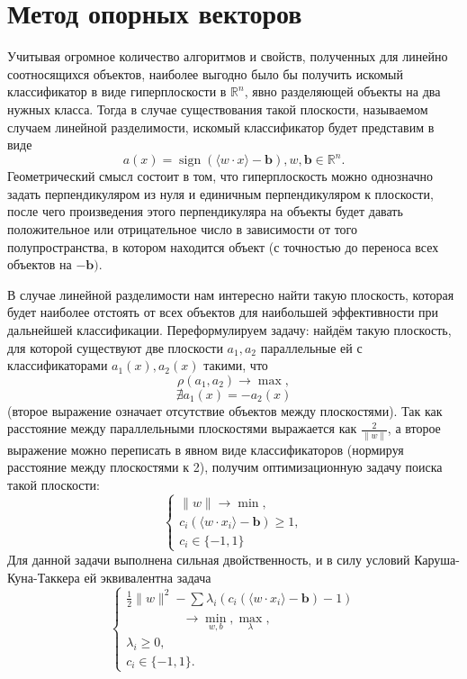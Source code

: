 \documentclass[twoside,twocolumn]{article}
\theoremstyle{plain}
\theoremstyle{definition}
\DeclareMathOperator{\sign}{sign}
\begin{document}
\section{Метод опорных векторов}
Учитывая огромное количество алгоритмов и свойств, полученных для линейно соотносящихся объектов, наиболее выгодно было бы получить искомый классификатор в виде гиперплоскости в $\mathbb{R}^n$, явно разделяющей объекты на два нужных класса. Тогда в случае существования такой плоскости, называемом случаем линейной разделимости, искомый классификатор будет представим в виде
\[ a(x) = \sign(\langle w \cdot x \rangle - \mathbf{b}), w, \mathbf{b} \in \mathbb{R}^n. \]
Геометрический смысл состоит в том, что гиперплоскость можно однозначно задать перпендикуляром из нуля и единичным перпендикуляром к плоскости, после чего произведения этого перпендикуляра на объекты будет давать положительное или отрицательное число в зависимости от того полупространства, в котором находится объект (с точностью до переноса всех объектов на $-\mathbf{b}).$ \par
В случае линейной разделимости нам интересно найти такую плоскость, которая будет наиболее отстоять от всех объектов для наибольшей эффективности при дальнейшей классификации. Переформулируем задачу: найдём такую плоскость, для которой существуют две плоскости $a_1, a_2$ параллельные ей с классификаторами $a_1(x), a_2(x)$ такими, что 
\[\rho(a_1, a_2) \xrightarrow{} \max,\] \[\nexists a_1(x) = -a_2(x)\] 
(второе выражение означает отсутствие объектов между плоскостями).
Так как расстояние между параллельными плоскостями выражается как $\frac{2}{\|w\|}$, а второе выражение можно переписать в явном виде классификаторов (нормируя расстояние между плоскостями к 2), получим оптимизационную задачу поиска такой плоскости:
\[
\begin{cases}
\|w\| \xrightarrow{} \min,\\
c_i(\langle w \cdot x_i \rangle - \mathbf{b}) \geq 1, \\
c_i \in \{-1, 1\}
\end{cases}
\]
Для данной задачи выполнена сильная двойственность, и в силу условий Каруша-Куна-Таккера ей эквивалентна задача 
\[
\begin{cases}
\frac{1}{2}\|w\|^2 - \sum \lambda_i (c_i(\langle w\cdot x_i \rangle - \mathbf{b}) - 1)\\ \;\;\;\;\;\;\;\;\;\;\;\;\;\;\;\; \xrightarrow{} \min_{w, b}, \max_{\lambda},\\
\lambda_i \geq 0, \\
c_i \in \{-1, 1\}.
\end{cases}
\]
\end{document}
